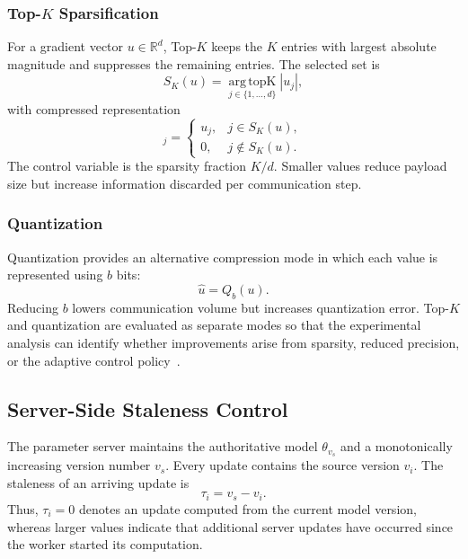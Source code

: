 \documentclass[conference]{IEEEtran}
\begin{document}
\subsubsection{Top-$K$ Sparsification}
For a gradient vector $u\in\mathbb{R}^{d}$, Top-$K$ keeps the $K$ entries with largest absolute magnitude and suppresses the remaining entries. The selected set is
\begin{equation}
 S_K(u)=\operatorname*{arg\,topK}_{j\in\{1,\ldots,d\}}|u_j|,
\end{equation}
with compressed representation
\begin{equation}
 [\mathcal{C}_K(u)]_j=
 \begin{cases}
 u_j,&j\in S_K(u),\\
 0,&j\notin S_K(u).
 \end{cases}
 \label{eq:topk}
\end{equation}
The control variable is the sparsity fraction $K/d$. Smaller values reduce payload size but increase information discarded per communication step.

\subsubsection{Quantization}
Quantization provides an alternative compression mode in which each value is represented using $b$ bits:
\begin{equation}
 \hat u=Q_b(u).
 \label{eq:quant}
\end{equation}
Reducing $b$ lowers communication volume but increases quantization error. Top-$K$ and quantization are evaluated as separate modes so that the experimental analysis can identify whether improvements arise from sparsity, reduced precision, or the adaptive control policy~\cite{lin2018deep,alistarh2017qsgd}.

\subsection{Server-Side Staleness Control}
\label{subsec:staleness}

The parameter server maintains the authoritative model $\theta_{v_s}$ and a monotonically increasing version number $v_s$. Every update contains the source version $v_i$. The staleness of an arriving update is
\begin{equation}
 \tau_i=v_s-v_i.
 \label{eq:staleness}
\end{equation}
Thus, $\tau_i=0$ denotes an update computed from the current model version, whereas larger values indicate that additional server updates have occurred since the worker started its computation.
\end{document}

